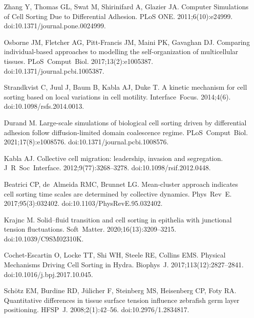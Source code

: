\documentclass[10pt,letterpaper]{article}
\begin{document}
\begin{thebibliography}{10}
Zhang Y, Thomas GL, Swat M, Shirinifard A, Glazier JA.
\newblock Computer {Simulations} of {Cell} {Sorting} {Due} to {Differential}
  {Adhesion}.
\newblock PLoS ONE. 2011;6(10):e24999.
\newblock doi:{10.1371/journal.pone.0024999}.

Osborne JM, Fletcher AG, Pitt-Francis JM, Maini PK, Gavaghan DJ.
\newblock Comparing individual-based approaches to modelling the
  self-organization of multicellular tissues.
\newblock PLoS~Comput~Biol. 2017;13(2):e1005387.
\newblock doi:{10.1371/journal.pcbi.1005387}.

Strandkvist C, Juul J, Baum B, Kabla AJ, Duke T.
\newblock A kinetic mechanism for cell sorting based on local variations in
  cell motility.
\newblock Interface~Focus. 2014;4(6).
\newblock doi:{10.1098/rsfs.2014.0013}.

Durand M.
\newblock Large-scale simulations of biological cell sorting driven by
  differential adhesion follow diffusion-limited domain coalescence regime.
\newblock PLoS~Comput~Biol. 2021;17(8):e1008576.
\newblock doi:{10.1371/journal.pcbi.1008576}.

Kabla AJ.
\newblock Collective cell migration: leadership, invasion and segregation.
\newblock J~R~Soc~Interface. 2012;9(77):3268--3278.
\newblock doi:{10.1098/rsif.2012.0448}.

Beatrici CP, de~Almeida RMC, Brunnet LG.
\newblock Mean-cluster approach indicates cell sorting time scales are
  determined by collective dynamics.
\newblock Phys~Rev~E. 2017;95(3):032402.
\newblock doi:{10.1103/PhysRevE.95.032402}.

Krajnc M.
\newblock Solid–fluid transition and cell sorting in epithelia with
  junctional tension fluctuations.
\newblock Soft~Matter. 2020;16(13):3209--3215.
\newblock doi:{10.1039/C9SM02310K}.

Cochet-Escartin O, Locke TT, Shi WH, Steele RE, Collins EMS.
\newblock Physical {Mechanisms} {Driving} {Cell} {Sorting} in {Hydra}.
\newblock Biophys~J. 2017;113(12):2827--2841.
\newblock doi:{10.1016/j.bpj.2017.10.045}.

Schötz EM, Burdine RD, Jülicher F, Steinberg MS, Heisenberg CP, Foty RA.
\newblock Quantitative differences in tissue surface tension influence
  zebrafish germ layer positioning.
\newblock HFSP~J. 2008;2(1):42--56.
\newblock doi:{10.2976/1.2834817}.


\end{thebibliography}
\end{document}
